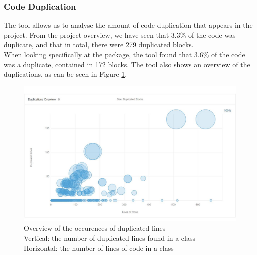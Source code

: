             
        \subsubsection{Code Duplication}
            The tool allows us to analyse the amount of code duplication that appears in the project. From the project overview, we have seen that 3.3\% of the code was duplicate, and that in total, there were 279 duplicated blocks. \\
            When looking specifically at the  package, the tool found that 3.6\% of the code was a duplicate, contained in 172 blocks.
            The tool also shows an overview of the duplications, as can be seen in  Figure \ref{fig:duplicatelines}. 
            \begin{figure}[H]
                \centering
                \includegraphics[scale=1]{figures/duplicatedlines.JPG}
                \caption{Overview of the occurences of duplicated lines\\
                        Vertical: the number of duplicated lines found in a class\\
                        Horizontal: the number of lines of code in a class}
                \label{fig:duplicatelines}
            \end{figure}
            
